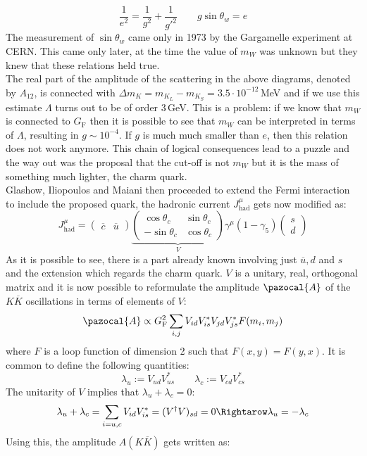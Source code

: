 \documentclass[../main.tex]{subfiles}
\begin{document}
\[
\frac{1}{e^2}=\frac{1}{g^2}+\frac{1}{g'^2} \qquad g\sin\theta_w=e
\]
The measurement of $\sin\theta_w$ came only in 1973 by the Gargamelle experiment at CERN. This came only later, at the time the value of $m_W$ was unknown but they knew that these relations held true.\\
The real part of the amplitude of the scattering in the above diagrams, denoted by $A_{12}$, is connected with $\Delta m_K=m_{K_L}-m_{K_S}=3.5\cdot10^{-12}$\,MeV and if we use this estimate $\Lambda$ turns out to be of order 3\,GeV. This is a problem: if we know that $m_W$ is connected to $G_{\text{F}}$ then it is possible to see that $m_W$ can be interpreted in terms of $\Lambda$, resulting in $g\sim10^{-4}$. If $g$ is much much smaller than $e$, then this relation does not work anymore. This chain of logical consequences lead to a puzzle and the way out was the proposal that the cut-off is not $m_W$ but it is the mass of something much lighter, the charm quark.\\
Glashow, Iliopoulos and Maiani then proceeded to extend the Fermi interaction to include the  proposed quark, the hadronic current $J^\mu_{\text{had}}$ gets now modified as:
\[
J^\mu_{\text{had}}=\begin{pmatrix}
    \overline{c} & \overline{u}
\end{pmatrix}\underbrace{\begin{pmatrix}
    \cos\theta_c & \sin\theta_c\\
    -\sin\theta_c & \cos\theta_c
\end{pmatrix}}_{V}\gamma^\mu(1-\gamma_5)\begin{pmatrix}
    s\\d
\end{pmatrix}
\]
As it is possible to see, there is a part already known involving just $\overline{u}, d$ and $s$ and the extension which regards the charm quark. $V$ is a unitary, real, orthogonal matrix and it is now possible to reformulate the amplitude $\pazocal{A}$ of the $K\overline{K}$ oscillations in terms of elements of $V$:
\[
\pazocal{A}\propto G_{\text{F}}^2\sum_{i,j}V_{id}V_{is}^*V_{jd}V_{js}^*F(m_i,m_j)
\]
where $F$ is a loop function of dimension 2 such that $F(x,y)=F(y,x)$. It is common to define the following quantities:
\[
\lambda_u:=V_{ud}V_{us}^* \qquad \lambda_c:=V_{cd}V_{cs}^*
\]
The unitarity of $V$ implies that $\lambda_u+\lambda_c=0$:
\[
\lambda_u+\lambda_c=\sum_{i=u,c}V_{id}V_{is}^*=(V^\dagger V)_{sd}=0\Rightarow\lambda_u=-\lambda_c
\]
Using this, the amplitude $A(K\overline{K})$ gets written as:
\end{document}
